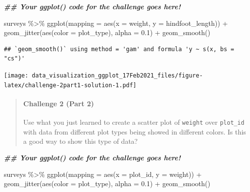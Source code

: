 \documentclass[
]{article}
\newenvironment{Shaded}{\begin{snugshade}}{\end{snugshade}}
\newcommand{\AttributeTok}[1]{\textcolor[rgb]{0.77,0.63,0.00}{#1}}
\newcommand{\DocumentationTok}[1]{\textcolor[rgb]{0.56,0.35,0.01}{\textbf{\textit{#1}}}}
\newcommand{\FloatTok}[1]{\textcolor[rgb]{0.00,0.00,0.81}{#1}}
\newcommand{\FunctionTok}[1]{\textcolor[rgb]{0.00,0.00,0.00}{#1}}
\newcommand{\NormalTok}[1]{#1}
\newcommand{\SpecialCharTok}[1]{\textcolor[rgb]{0.00,0.00,0.00}{#1}}
\begin{document}
\begin{Shaded}
\begin{Highlighting}[]
\DocumentationTok{\#\# Your ggplot() code for the challenge goes here!}
\end{Highlighting}
\end{Shaded}

\begin{Shaded}
\begin{Highlighting}[]
\NormalTok{surveys }\SpecialCharTok{\%\textgreater{}\%} 
  \FunctionTok{ggplot}\NormalTok{(}\AttributeTok{mapping =} \FunctionTok{aes}\NormalTok{(}\AttributeTok{x =}\NormalTok{ weight, }\AttributeTok{y =}\NormalTok{ hindfoot\_length)) }\SpecialCharTok{+}
  \FunctionTok{geom\_jitter}\NormalTok{(}\FunctionTok{aes}\NormalTok{(}\AttributeTok{color =}\NormalTok{ plot\_type), }\AttributeTok{alpha =} \FloatTok{0.1}\NormalTok{) }\SpecialCharTok{+} 
  \FunctionTok{geom\_smooth}\NormalTok{()}
\end{Highlighting}
\end{Shaded}

\begin{verbatim}
## `geom_smooth()` using method = 'gam' and formula 'y ~ s(x, bs = "cs")'
\end{verbatim}

\texttt{[image: data\_visualization\_ggplot\_17Feb2021\_files/figure-latex/challenge-2part1-solution-1.pdf]}

\begin{quote}
\mbox{}%
\hypertarget{challenge-2-part-2}{%
\paragraph{Challenge 2 (Part 2)}\label{challenge-2-part-2}}

Use what you just learned to create a scatter plot of \texttt{weight}
over \texttt{plot\_id} with data from different plot types being showed
in different colors. Is this a good way to show this type of data?
\end{quote}

\begin{Shaded}
\begin{Highlighting}[]
\DocumentationTok{\#\# Your ggplot() code for the challenge goes here!}
\end{Highlighting}
\end{Shaded}

\begin{Shaded}
\begin{Highlighting}[]
\NormalTok{surveys }\SpecialCharTok{\%\textgreater{}\%} 
  \FunctionTok{ggplot}\NormalTok{(}\AttributeTok{mapping =} \FunctionTok{aes}\NormalTok{(}\AttributeTok{x =}\NormalTok{ plot\_id, }\AttributeTok{y =}\NormalTok{ weight)) }\SpecialCharTok{+}
  \FunctionTok{geom\_jitter}\NormalTok{(}\FunctionTok{aes}\NormalTok{(}\AttributeTok{color =}\NormalTok{ plot\_type), }\AttributeTok{alpha =} \FloatTok{0.1}\NormalTok{) }\SpecialCharTok{+} 
  \FunctionTok{geom\_smooth}\NormalTok{()}
\end{Highlighting}
\end{Shaded}
\end{document}
